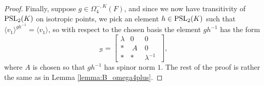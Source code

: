 \begin{proof}
	Finally, suppose $g \in \Omega_4^{-,K}(F)$, and since we now have transitivity of $\mathrm{PSL}_2(K)$ on isotropic points,
	we pick an element $h \in \mathrm{PSL}_2(K)$ such that $\langle v_1 \rangle^{g h^{-1}} = \langle v_1 \rangle$, so with respect
	to the chosen basis the element $g h^{-1}$ has the form
	\begin{equation*}
			[g h^{-1}]_{\mathcal{B}} = 
		\left[
	    \begin{array}{c|c|c}
		\lambda & 0 & 0\  \\ \hline 
		* &\  A\   & 0\  \\ \hline
		* & * & \lambda^{-1}\ 
	    \end{array}
	\right],
	\end{equation*}
	where $A$ is chosen so that $g h^{-1}$ has spinor norm $1$. The rest of the proof is rather the same as 
	in Lemma \ref{lemma:B_omega4plus}. 
\end{proof}

